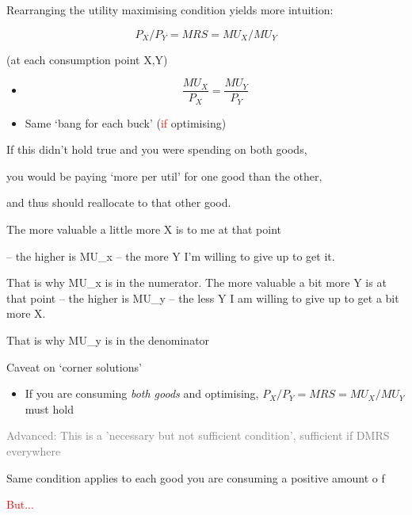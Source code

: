 \documentclass[table]{beamer}
\providecommand{\tightlist}{%
  \setlength{\itemsep}{0pt}\setlength{\parskip}{0pt}}
\begin{document}
\begin{frame}

Rearranging the utility maximising condition yields more intuition:

\[P_X/P_Y = MRS = MU_X/MU_Y\]

(at each consumption point X,Y)

\medskip

\begin{itemize}[<+->]
\tightlist
\item
  \[\frac{MU_X}{P_X} = \frac{MU_Y}{P_Y}\]
\end{itemize}

\begin{itemize}[<+->]
\tightlist
\item
  Same `bang for each buck' (\textcolor{red}{if} optimising)
\end{itemize}

If this didn't hold true and you were spending on both goods,

you would be paying `more per util' for one good than the other,

and thus should reallocate to that other good.

The more valuable a little more X is to me at that point

-- the higher is MU\_x -- the more Y I'm willing to give up to get it.

That is why MU\_x is in the numerator. The more valuable a bit more Y is
at that point -- the higher is MU\_y -- the less Y I am willing to give
up to get a bit more X.

That is why MU\_y is in the denominator

\begin{block}{Caveat on `corner solutions'}

\begin{itemize}
\tightlist
\item
  If you are consuming \emph{both goods} and optimising,
  \(P_X/P_Y = MRS = MU_X/MU_Y\) must hold
\end{itemize}

\bigskip

\textcolor{gray}{Advanced: This is a 'necessary but not sufficient condition', sufficient if DMRS everywhere}

Same condition applies to each good you are consuming a positive amount
o \bigskip f

\bigskip

\textcolor{red}{But...}

\end{block}

\end{frame}
\end{document}
